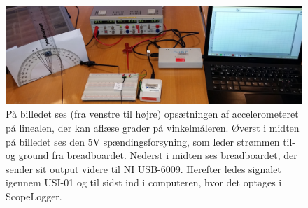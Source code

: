 \begin{figure}[H]
	\centering
	\label{pforsoeg2}
	\includegraphics[scale=0.14]{figures/cProblemloesning/Pilotforsoeg1.jpg}
	\caption{På billedet ses (fra venstre til højre) opsætningen af accelerometeret på linealen, der kan aflæse grader på vinkelmåleren. Øverst i midten på billedet ses den 5V spændingsforsyning, som leder strømmen til- og ground fra breadboardet. Nederst i midten ses breadboardet, der sender sit output videre til NI USB-6009. Herefter ledes signalet igennem USI-01 og til sidst ind i computeren, hvor det optages i ScopeLogger.}
\end{figure}
